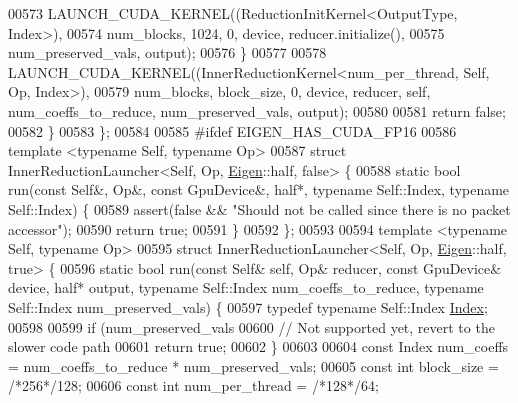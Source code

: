 \begin{DoxyCode}
00573       LAUNCH\_CUDA\_KERNEL((ReductionInitKernel<OutputType, Index>),
00574                          num\_blocks, 1024, 0, device, reducer.initialize(),
00575                          num\_preserved\_vals, output);
00576     \}
00577 
00578     LAUNCH\_CUDA\_KERNEL((InnerReductionKernel<num\_per\_thread, Self, Op, Index>),
00579                        num\_blocks, block\_size, 0, device, reducer, \textcolor{keyword}{self}, num\_coeffs\_to\_reduce, 
      num\_preserved\_vals, output);
00580 
00581     \textcolor{keywordflow}{return} \textcolor{keyword}{false};
00582   \}
00583 \};
00584 
00585 \textcolor{preprocessor}{#ifdef EIGEN\_HAS\_CUDA\_FP16}
00586 \textcolor{keyword}{template} <\textcolor{keyword}{typename} Self, \textcolor{keyword}{typename} Op>
00587 \textcolor{keyword}{struct }InnerReductionLauncher<Self, Op, \hyperlink{namespace_eigen}{Eigen}::half, false> \{
00588   \textcolor{keyword}{static} \textcolor{keywordtype}{bool} run(\textcolor{keyword}{const} Self&, Op&, \textcolor{keyword}{const} GpuDevice&, half*, \textcolor{keyword}{typename} Self::Index, \textcolor{keyword}{typename} Self::Index) \{
00589     assert(\textcolor{keyword}{false} && \textcolor{stringliteral}{"Should not be called since there is no packet accessor"});
00590     \textcolor{keywordflow}{return} \textcolor{keyword}{true};
00591   \}
00592 \};
00593 
00594 \textcolor{keyword}{template} <\textcolor{keyword}{typename} Self, \textcolor{keyword}{typename} Op>
00595 \textcolor{keyword}{struct }InnerReductionLauncher<Self, Op, \hyperlink{namespace_eigen}{Eigen}::half, true> \{
00596   \textcolor{keyword}{static} \textcolor{keywordtype}{bool} run(\textcolor{keyword}{const} Self& \textcolor{keyword}{self}, Op& reducer, \textcolor{keyword}{const} GpuDevice& device, half* output, \textcolor{keyword}{typename} 
      Self::Index num\_coeffs\_to\_reduce, \textcolor{keyword}{typename} Self::Index num\_preserved\_vals) \{
00597     \textcolor{keyword}{typedef} \textcolor{keyword}{typename} Self::Index \hyperlink{namespace_eigen_a62e77e0933482dafde8fe197d9a2cfde}{Index};
00598 
00599     \textcolor{keywordflow}{if} (num\_preserved\_vals %
00600       \textcolor{comment}{// Not supported yet, revert to the slower code path}
00601       \textcolor{keywordflow}{return} \textcolor{keyword}{true};
00602     \}
00603 
00604     \textcolor{keyword}{const} Index num\_coeffs = num\_coeffs\_to\_reduce * num\_preserved\_vals;
00605     \textcolor{keyword}{const} \textcolor{keywordtype}{int} block\_size = \textcolor{comment}{/*256*/}128;
00606     \textcolor{keyword}{const} \textcolor{keywordtype}{int} num\_per\_thread = \textcolor{comment}{/*128*/}64;

\end{DoxyCode}

